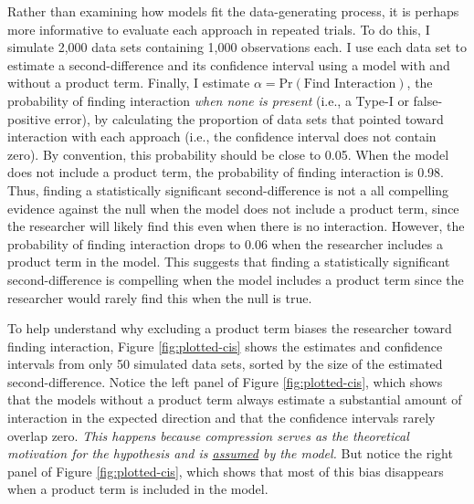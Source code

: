 \documentclass[12pt]{article}
\begin{document}
Rather than examining how models fit the data-generating process, it is perhaps more informative to evaluate each approach in repeated trials. To do this, I simulate 2,000 data sets containing 1,000 observations each. I use each data set to estimate a second-difference and its confidence interval using a model with and without a product term. Finally, I estimate $\alpha = \text{Pr}(\text{Find Interaction})$, the probability of finding interaction \textit{when none is present} (i.e., a Type-I or false-positive error), by calculating the proportion of data sets that pointed toward interaction with each approach (i.e., the confidence interval does not contain zero). By convention, this probability should be close to 0.05. When the model does not include a product term, the probability of finding interaction is 0.98. Thus,  finding a statistically significant second-difference is not a all  compelling evidence against the null when the model does not include a product term, since the researcher will likely find this even when there is no interaction. However, the probability of finding interaction drops to 0.06 when the researcher includes a product term in the model. This suggests that finding a statistically significant second-difference is compelling  when the model includes a product term since the researcher would rarely find this when the null is true.

To help understand why excluding a product term biases the researcher toward finding interaction, Figure \ref{fig:plotted-cis} shows the estimates and confidence intervals from only 50 simulated data sets, sorted by the size of the estimated second-difference. Notice the left panel of Figure \ref{fig:plotted-cis}, which shows that the models without a product term always estimate a substantial amount of interaction in the expected direction  and that the confidence intervals rarely overlap zero. \textit{This happens because compression serves as the theoretical motivation for the hypothesis and is \underline{assumed} by the model.} But notice the right panel of Figure \ref{fig:plotted-cis}, which shows that most of this bias disappears when a product term is included in the model.
\end{document}
